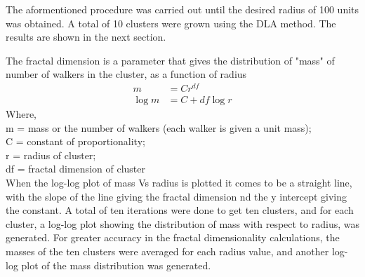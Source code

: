 \documentclass[a4paper,12pt]{article}
\begin{document}
\indent The aformentioned procedure was carried out until the desired radius of 100 units was obtained.  A total of 10 clusters were grown using the DLA method.  The
results are shown in the next section.


\indent The fractal dimension is a parameter that gives the distribution of "mass" of number of walkers in the cluster, as a function of radius
\begin{align}
m &= C r^{df} \\
\log{m} &= C + df\log{r}
\label{fractal dimension}
\end{align}
Where, \\
m = mass or the number of walkers (each walker is given a unit mass);\\
C = constant of proportionality; \\
r = radius of cluster; \\
df = fractal dimension of cluster \\

\indent When the log-log plot of mass Vs radius is plotted it comes to be a straight line, with the slope of the line giving the fractal dimension nd the y intercept giving the constant. 
A total of ten iterations were done to get ten clusters, and for each cluster, a log-log plot showing the distribution of mass with respect to radius, was generated. For greater accuracy in the fractal dimensionality
calculations, the masses of the ten clusters were averaged for each radius value, and another log-log plot of the mass distribution was generated.
\end{document}
